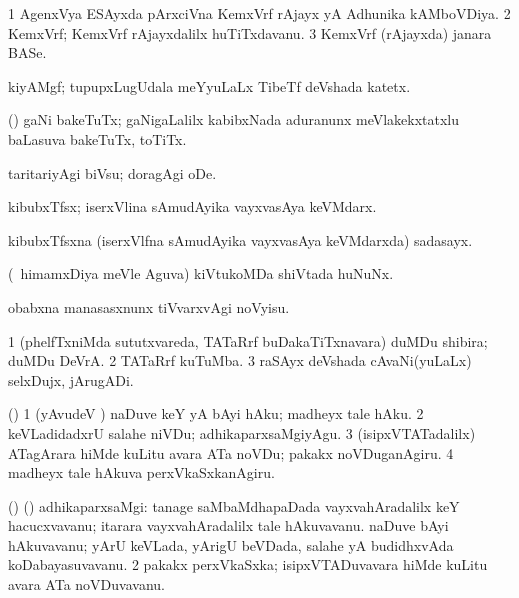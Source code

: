 \bentry
{}
\gl{\nA}
\bmng
\bnum
\num{1} AgenxVya ESAyxda pArxciVna KemxVrf rAjayx yA Adhunika kAMboVDiya. 
\num{2} KemxVrf; KemxVrf rAjayxdalilx huTiTxdavanu. 
\num{3} KemxVrf (rAjayxda) janara BASe. 
\enum
\emng
\eentry

\bentry
{}
\gl{\saMkiSx}
\bmng
{} 
\emng
\eentry

\bentry
{}
\gl{\nA}
\bmng
kiyAMgf; tupupxLugUdala meYyuLaLx TibeTf deVshada katetx. 
\emng
\eentry

\bentry
{}
\gl{\nA}
\bmng
(\birx) gaNi bakeTuTx; gaNigaLalilx kabibxNada aduranunx meVlakekxtatxlu baLasuva bakeTuTx, toTiTx. 
\emng
\eentry

\bentry
{}
\gl{\sakirx}
\bmng
taritariyAgi biVsu; doragAgi oDe. 
\emng
\eentry

\bentry
{}
\gl{\nA}
\bmng
kibubxTfsx; iserxVlina sAmudAyika vayxvasAya keVMdarx. 
\emng
\eentry

\bentry
{}
\gl{\nA}
\bmng
kibubxTfsxna (iserxVlfna sAmudAyika vayxvasAya keVMdarxda) sadasayx. 
\emng
\eentry

\bentry
{}
\gl{\nA}
\bmng
(\kanmu\ himamxDiya meVle Aguva) kiVtukoMDa shiVtada huNuNx. 
\emng

\noindent
\gl{\nuga}
\bmng
{} obabxna manasasxnunx tiVvarxvAgi noVyisu. 
\emng
\eentry

\bentry
{}
\gl{\nA}
\bmng
\bnum
\num{1} (phelfTxniMda sututxvareda, TATaRrf buDakaTiTxnavara) duMDu shibira; duMDu DeVrA. 
\num{2} TATaRrf kuTuMba. 
\num{3} raSAyx deVshada cAvaNi(yuLaLx) selxDujx, jArugADi. 
\enum
\emng
\eentry

\bentry
{}
\gl{\akirx}
\bmng
(\AmA)%
\bnum
\num{1} (yAvudeV \vi) naDuve keY yA bAyi hAku; madheyx tale hAku. 
\num{2} keVLadidadxrU salahe niVDu; adhikaparxsaMgiyAgu. 
\num{3} (isipxVTATadalilx) ATagArara hiMde kuLitu avara ATa noVDu; pakakx noVDuganAgiru. 
\num{4} madheyx tale hAkuva perxVkaSxkanAgiru. 
\enum
\emng
\eentry

\bentry
{}
\gl{\nA}
\bmng
(\ame) (\AmA)%
\bnum
{} adhikaparxsaMgi: 
\banum
{} tanage saMbaMdhapaDada vayxvahAradalilx keY hacucxvavanu; itarara vayxvahAradalilx tale hAkuvavanu. 
 naDuve bAyi hAkuvavanu; yArU keVLada, yArigU beVDada, salahe yA budidhxvAda koDabayasuvavanu. 
\eanum
\numie
\num{2} pakakx perxVkaSxka; isipxVTADuvavara hiMde kuLitu avara ATa noVDuvavanu. 
\enum
\emng
\eentry

